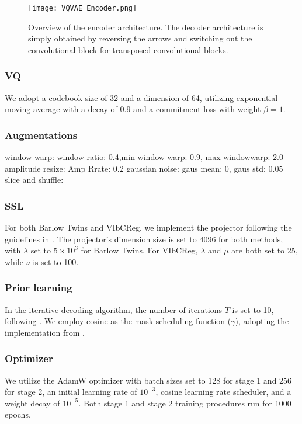 \documentclass[../../thesis.tex]{subfiles}
\begin{document}
\begin{figure}[h]
    
    \texttt{[image: VQVAE Encoder.png]}
    \centering
    \caption{Overview of the encoder architecture. The decoder architecture is simply obtained by reversing the arrows and switching out the convolutional block for transposed convolutional blocks.}
    \label{fig:VQVAE Encoder}
\end{figure}

\subsubsection{VQ}
We adopt a codebook size of 32 and a dimension of 64, utilizing exponential moving average with a decay of 0.9 and a commitment loss with weight $\beta = 1$.

\subsubsection{Augmentations}
window warp:    window ratio: 0.4,min window warp: 0.9, max windowwarp: 2.0\newline
amplitude resize: Amp Rrate: 0.2\newline
gaussian noise: gaus mean: 0, gaus std: 0.05\newline
slice and shuffle:

\subsubsection{SSL}
For both Barlow Twins and VIbCReg, we implement the projector following the guidelines in \cite{lee2024computer}. The projector's dimension size is set to 4096 for both methods, with $\lambda$ set to $5 \times 10^3$ for Barlow Twins. For VIbCReg, $\lambda$ and $\mu$ are both set to 25, while $\nu$ is set to 100.

\subsubsection{Prior learning}
In the iterative decoding algorithm, the number of iterations $T$ is set to 10, following \cite{chang2022maskgit}. We employ cosine as the mask scheduling function ($\gamma$), adopting the implementation from \cite{TimeVQVAE}. 


\subsubsection{Optimizer}
We utilize the AdamW optimizer with batch sizes set to 128 for stage 1 and 256 for stage 2, an initial learning rate of $10^{-3}$, cosine learning rate scheduler, and a weight decay of $10^{-5}$. Both stage 1 and stage 2 training procedures run for 1000 epochs.
\end{document}
